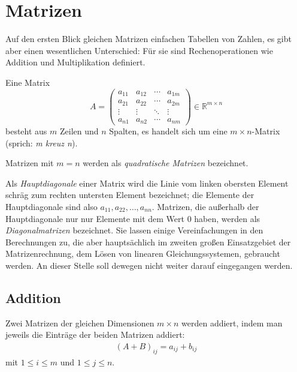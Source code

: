

\section{Matrizen}
Auf den ersten Blick gleichen Matrizen einfachen Tabellen von Zahlen, es gibt aber einen wesentlichen Unterschied: Für sie sind Rechenoperationen wie Addition und Multiplikation definiert.

Eine Matrix
\begin{equation}
 A = \begin{pmatrix}
   a_{11} & a_{12} & \cdots & a_{1m}\\
   a_{21} & a_{22} & \cdots & a_{2m}\\
   \vdots & \vdots & \ddots & \vdots\\
   a_{n1} & a_{n2} & \cdots & a_{nm}
 \end{pmatrix}
 \in \mathbb{R}^{m \times n}
\end{equation}
besteht aus $m$ Zeilen und $n$ Spalten, es handelt sich um eine $m \times n$-Matrix (sprich: \emph{m kreuz n}).

Matrizen mit $m = n$ werden als \emph{quadratische Matrizen} bezeichnet.

Als \emph{Hauptdiagonale} einer Matrix wird die Linie vom linken obersten Element schräg zum rechten untersten Element bezeichnet; die Elemente der Hauptdiagonale sind also $a_{11}, a_{22}, \ldots, a_{nn}$. Matrizen, die außerhalb der Hauptdiagonale nur nur Elemente mit dem Wert 0 haben, werden als \emph{Diagonalmatrizen} bezeichnet. Sie lassen einige Vereinfachungen in den Berechnungen zu, die aber hauptsächlich im zweiten großen Einsatzgebiet der Matrizenrechnung, dem Lösen von linearen Gleichungssystemen, gebraucht werden. An dieser Stelle soll dewegen nicht weiter darauf eingegangen werden.


\subsection{Addition}
Zwei Matrizen der gleichen Dimensionen $m \times n$ werden addiert, indem man jeweils die Einträge der beiden Matrizen addiert:
\begin{align}
 (A + B)_{ij} = a_{ij} + b_{ij}%
\end{align}
mit $1 \leq i \leq m$ und $1 \leq j \leq n$.

